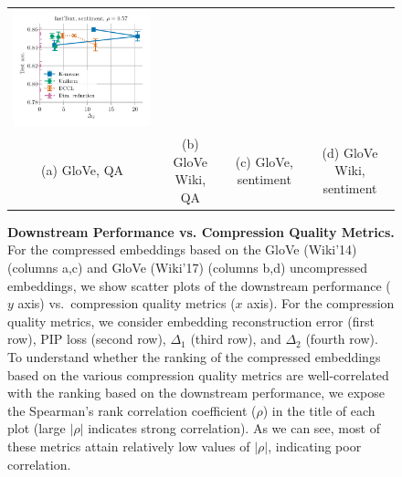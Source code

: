\begin{figure}
\begin{tabular}{@{\hskip -0.0in}c@{\hskip -0.0in}c@{\hskip -0.0in}c@{\hskip -0.0in}c@{\hskip -0.0in}}
		\includegraphics[width=.245\linewidth]{figures/fasttext1m_sentiment_sst_test-acc_vs_gram-large-dim-delta2-2_linx_det.pdf} \\
		(a) GloVe, QA & (b) GloVe Wiki, QA  & (c) GloVe, sentiment & (d) GloVe Wiki, sentiment
	\end{tabular}
	\caption{
		\textbf{Downstream Performance vs. Compression Quality Metrics.}
		For the compressed embeddings based on the GloVe (Wiki'14) (columns a,c) and GloVe (Wiki'17) (columns b,d) uncompressed embeddings, we show scatter plots of the downstream performance ($y$ axis) vs.\ compression quality metrics ($x$ axis).
		For the compression quality metrics, we consider embedding reconstruction error (first row), PIP loss (second row), $\Delta_1$ (third row), and $\Delta_2$ (fourth row).
		To understand whether the ranking of the compressed embeddings based on the various compression quality metrics are well-correlated with the ranking based on the downstream performance, we expose the Spearman's rank correlation coefficient ($\rho$) in the title of each plot (large $|\rho|$ indicates strong correlation).
		As we can see, most of these metrics attain relatively low values of $|\rho|$, indicating poor correlation.}
	\label{fig:bad_correlation_det}
\end{figure}



